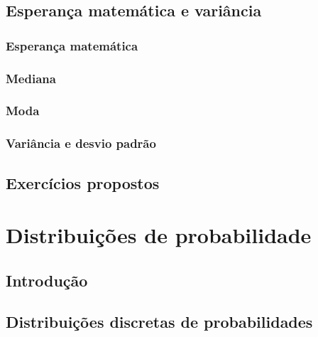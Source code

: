 \documentclass[
]{book}
\begin{document}
\hypertarget{esperanuxe7a-matemuxe1tica-e-variuxe2ncia}{%
\section{Esperança matemática e variância}\label{esperanuxe7a-matemuxe1tica-e-variuxe2ncia}}

\hypertarget{esperanuxe7a-matemuxe1tica}{%
\subsection{Esperança matemática}\label{esperanuxe7a-matemuxe1tica}}

\hypertarget{mediana-1}{%
\subsection{Mediana}\label{mediana-1}}

\hypertarget{moda-1}{%
\subsection{Moda}\label{moda-1}}

\hypertarget{variuxe2ncia-e-desvio-padruxe3o}{%
\subsection{Variância e desvio padrão}\label{variuxe2ncia-e-desvio-padruxe3o}}

\hypertarget{exercuxedcios-propostos}{%
\section*{Exercícios propostos}\label{exercuxedcios-propostos}}


\hypertarget{chap:cap6}{%
\chapter{Distribuições de probabilidade}\label{chap:cap6}}

\hypertarget{introduuxe7uxe3o-3}{%
\section{Introdução}\label{introduuxe7uxe3o-3}}

\hypertarget{distribuiuxe7uxf5es-discretas-de-probabilidades}{%
\section{Distribuições discretas de probabilidades}\label{distribuiuxe7uxf5es-discretas-de-probabilidades}}
\end{document}
